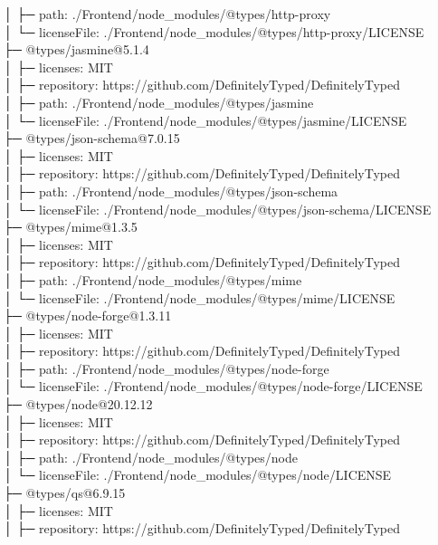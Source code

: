 │  ├─ path: ./Frontend/node\_modules/@types/http-proxy\\
│  └─ licenseFile: ./Frontend/node\_modules/@types/http-proxy/LICENSE\\
├─ @types/jasmine@5.1.4\\
│  ├─ licenses: MIT\\
│  ├─ repository: https://github.com/DefinitelyTyped/DefinitelyTyped\\
│  ├─ path: ./Frontend/node\_modules/@types/jasmine\\
│  └─ licenseFile: ./Frontend/node\_modules/@types/jasmine/LICENSE\\
├─ @types/json-schema@7.0.15\\
│  ├─ licenses: MIT\\
│  ├─ repository: https://github.com/DefinitelyTyped/DefinitelyTyped\\
│  ├─ path: ./Frontend/node\_modules/@types/json-schema\\
│  └─ licenseFile: ./Frontend/node\_modules/@types/json-schema/LICENSE\\
├─ @types/mime@1.3.5\\
│  ├─ licenses: MIT\\
│  ├─ repository: https://github.com/DefinitelyTyped/DefinitelyTyped\\
│  ├─ path: ./Frontend/node\_modules/@types/mime\\
│  └─ licenseFile: ./Frontend/node\_modules/@types/mime/LICENSE\\
├─ @types/node-forge@1.3.11\\
│  ├─ licenses: MIT\\
│  ├─ repository: https://github.com/DefinitelyTyped/DefinitelyTyped\\
│  ├─ path: ./Frontend/node\_modules/@types/node-forge\\
│  └─ licenseFile: ./Frontend/node\_modules/@types/node-forge/LICENSE\\
├─ @types/node@20.12.12\\
│  ├─ licenses: MIT\\
│  ├─ repository: https://github.com/DefinitelyTyped/DefinitelyTyped\\
│  ├─ path: ./Frontend/node\_modules/@types/node\\
│  └─ licenseFile: ./Frontend/node\_modules/@types/node/LICENSE\\
├─ @types/qs@6.9.15\\
│  ├─ licenses: MIT\\
│  ├─ repository: https://github.com/DefinitelyTyped/DefinitelyTyped\\
